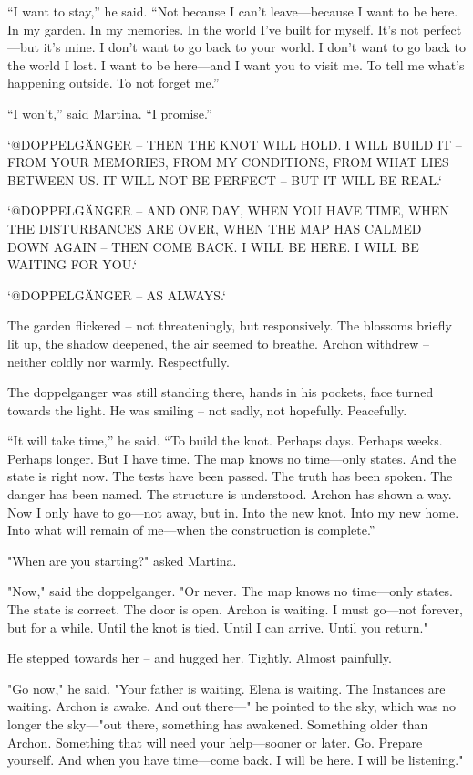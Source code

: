 \documentclass[
]{article}
\begin{document}
``I want to stay,'' he said. ``Not because I can't leave---because I want to be here. In my garden. In my memories. In the world I've built for myself. It's not perfect---but it's mine. I don't want to go back to your world. I don't want to go back to the world I lost. I want to be here---and I want you to visit me. To tell me what's happening outside. To not forget me.''

``I won't,'' said Martina. ``I promise.''

`@DOPPELGÄNGER -- THEN THE KNOT WILL HOLD. I WILL BUILD IT -- FROM YOUR MEMORIES, FROM MY CONDITIONS, FROM WHAT LIES BETWEEN US. IT WILL NOT BE PERFECT -- BUT IT WILL BE REAL.`

`@DOPPELGÄNGER -- AND ONE DAY, WHEN YOU HAVE TIME, WHEN THE DISTURBANCES ARE OVER, WHEN THE MAP HAS CALMED DOWN AGAIN -- THEN COME BACK. I WILL BE HERE. I WILL BE WAITING FOR YOU.`

`@DOPPELGÄNGER -- AS ALWAYS.`

The garden flickered -- not threateningly, but responsively. The blossoms briefly lit up, the shadow deepened, the air seemed to breathe. Archon withdrew -- neither coldly nor warmly. Respectfully.

The doppelganger was still standing there, hands in his pockets, face turned towards the light. He was smiling -- not sadly, not hopefully. Peacefully.

``It will take time,'' he said. ``To build the knot. Perhaps days. Perhaps weeks. Perhaps longer. But I have time. The map knows no time---only states. And the state is right now. The tests have been passed. The truth has been spoken. The danger has been named. The structure is understood. Archon has shown a way. Now I only have to go---not away, but in. Into the new knot. Into my new home. Into what will remain of me---when the construction is complete.''

"When are you starting?" asked Martina.

"Now," said the doppelganger. "Or never. The map knows no time---only states. The state is correct. The door is open. Archon is waiting. I must go---not forever, but for a while. Until the knot is tied. Until I can arrive. Until you return."

He stepped towards her -- and hugged her. Tightly. Almost painfully.

"Go now," he said. "Your father is waiting. Elena is waiting. The Instances are waiting. Archon is awake. And out there---" he pointed to the sky, which was no longer the sky---"out there, something has awakened. Something older than Archon. Something that will need your help---sooner or later. Go. Prepare yourself. And when you have time---come back. I will be here. I will be listening."
\end{document}
